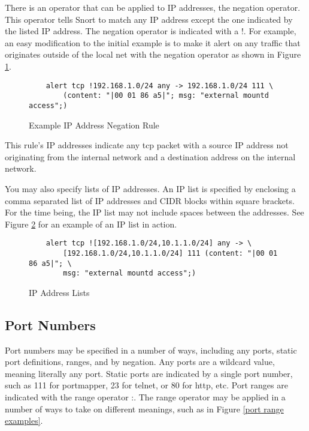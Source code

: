 \documentclass[english]{report}
\begin{document}
There is an operator that can be applied to IP addresses, the negation
operator. This operator tells Snort to match any IP address except the one
indicated by the listed IP address. The negation operator is indicated with a
!. For example, an easy modification to the initial example is to make it alert
on any traffic that originates outside of the local net with the negation
operator as shown in Figure \ref{Example Negation}.

\begin{center}
\begin{figure}
\begin{verbatim}
    alert tcp !192.168.1.0/24 any -> 192.168.1.0/24 111 \
        (content: "|00 01 86 a5|"; msg: "external mountd access";)
\end{verbatim}

\caption{\label{Example Negation} Example IP Address Negation Rule}
\end{figure}
\end{center}

This rule's IP addresses indicate any tcp packet with a source IP address not
originating from the internal network and a destination address on the internal
network.

You may also specify lists of IP addresses. An IP list is specified by
enclosing a comma separated list of IP addresses and CIDR blocks within square
brackets. For the time being, the IP list may not include spaces between the
addresses. See Figure \ref{IP list usage} for an example of an IP list in
action.

\begin{center}
\begin{figure}
\begin{verbatim}
    alert tcp ![192.168.1.0/24,10.1.1.0/24] any -> \
        [192.168.1.0/24,10.1.1.0/24] 111 (content: "|00 01 86 a5|"; \
        msg: "external mountd access";)
\end{verbatim}

\caption{\label{IP list usage}IP Address Lists}
\end{figure}
\end{center}

\subsection{Port Numbers}

Port numbers may be specified in a number of ways, including any ports, static
port definitions, ranges, and by negation. Any ports are a wildcard value,
meaning literally any port. Static ports are indicated by a single port number,
such as 111 for portmapper, 23 for telnet, or 80 for http, etc. Port ranges are
indicated with the range operator :. The range operator may be applied in a
number of ways to take on different meanings, such as in Figure \ref{port range
examples}.
\end{document}
